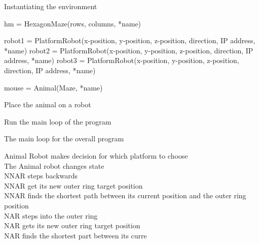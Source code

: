 \begin{algorithm}
\caption{Instantiating the environment}
\begin{algorithmic}

\STATE hm = HexagonMaze(rows, columns, *name) 

\STATE
\STATE robot1 = PlatformRobot(x-position, y-position, z-position, direction, IP address, *name) 
\STATE robot2 = PlatformRobot(x-position, y-position, z-position, direction, IP address, *name) 
\STATE robot3 = PlatformRobot(x-position, y-position, z-position, direction, IP address, *name) 

\STATE
\STATE mouse = Animal(Maze, *name)

\STATE
\STATE Place the animal on a robot

\STATE
\STATE Run the main loop of the program

\end{algorithmic}
\end{algorithm}

\begin{algorithm}
\caption{The main loop for the overall program}
Animal Robot makes decision for which platform to choose \\

\STATE The Animal robot changes state \\ 

\STATE NNAR steps backwards \\ 
\STATE NNAR get its new outer ring target position \\
\STATE NNAR finds the shortest path between its current position and the outer ring position \\


\STATE NAR steps into the outer ring \\
\STATE NAR gets its new outer ring target position \\
\STATE NAR finds the shortest part between its curre




\end{algorithm}

